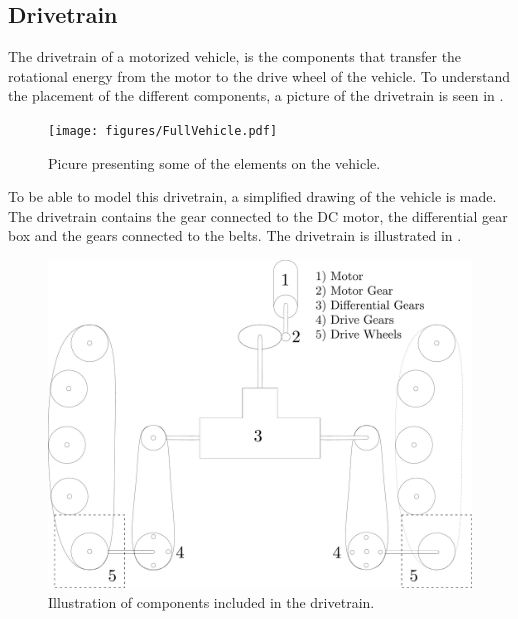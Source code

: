 \subsection{Drivetrain}
The drivetrain of a motorized vehicle, is the components that transfer the rotational energy from the motor to the drive wheel of the vehicle. To understand the placement of the different components, a picture of the drivetrain is seen in . 

\begin{figure}[H]
	\centering
	\texttt{[image: figures/FullVehicle.pdf]}
	\caption{Picure presenting some of the elements on the vehicle.}
	\label{FullVehicle}
\end{figure}\vspace{-5mm}

To be able to model this drivetrain, a simplified drawing of the vehicle is made. The drivetrain contains the gear connected to the DC motor, the differential gear box and the gears connected to the belts. The drivetrain is illustrated in .

\begin{figure}[H]
	\centering
	\includegraphics[scale=.25]{figures/vehicleDescriptionDriveTrain.pdf}
	\caption{Illustration of components included in the drivetrain.}
	\label{vehicleDescriptionDriveTrain}
\end{figure}\vspace{-5mm}

